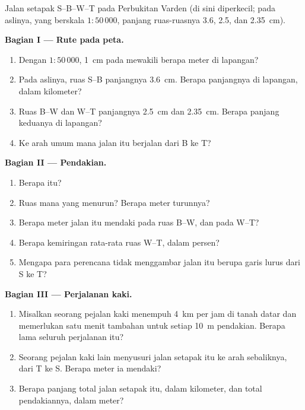 \begin{problem}
\begin{omfigure}
{\small Jalan setapak S--B--W--T pada  Perbukitan Varden
(di sini diperkecil; pada  aslinya, yang berskala $1 : 50\,000$,
panjang ruas-ruasnya 3.6, 2.5, dan \qty{2.35}{cm}).}
\label{fig:g9:maps-of-the-earth:path}
\end{omfigure}

\noindent\textbf{Bagian I --- Rute pada peta.}\par\nopagebreak
\begin{enumerate}[beginpenalty=10000]
  \item Dengan  $1 : 50\,000$, \qty{1}{cm} pada  mewakili berapa
        meter di lapangan?
  \item Pada  aslinya, ruas S--B panjangnya \qty{3.6}{cm}. Berapa
        panjangnya di lapangan, dalam kilometer?
  \item Ruas B--W dan W--T panjangnya \qty{2.5}{cm} dan \qty{2.35}{cm}.
        Berapa panjang keduanya di lapangan?
  \item Ke arah umum mana jalan itu berjalan dari B ke T?
\end{enumerate}

\noindent\textbf{Bagian II --- Pendakian.}\par\nopagebreak
\begin{enumerate}[resume, beginpenalty=10000]
  \item Berapa   itu?
  \item Ruas mana yang menurun? Berapa meter turunnya?
  \item Berapa meter jalan itu mendaki pada ruas B--W, dan pada W--T?
  \item Berapa kemiringan rata-rata ruas W--T, dalam persen?
  \item Mengapa para perencana tidak menggambar jalan itu berupa garis
        lurus dari S ke T?
\end{enumerate}

\noindent\textbf{Bagian III --- Perjalanan kaki.}\par\nopagebreak
\begin{enumerate}[resume, beginpenalty=10000]
  \item Misalkan seorang pejalan kaki menempuh \qty{4}{km} per jam di
        tanah datar dan memerlukan satu menit tambahan untuk setiap
        \qty{10}{m} pendakian. Berapa lama seluruh perjalanan itu?
  \item Seorang pejalan kaki lain menyusuri jalan setapak itu ke arah
        sebaliknya, dari T ke S. Berapa meter ia mendaki?
  \item Berapa panjang total jalan setapak itu, dalam kilometer, dan
        total pendakiannya, dalam meter?
\end{enumerate}
\end{problem}
